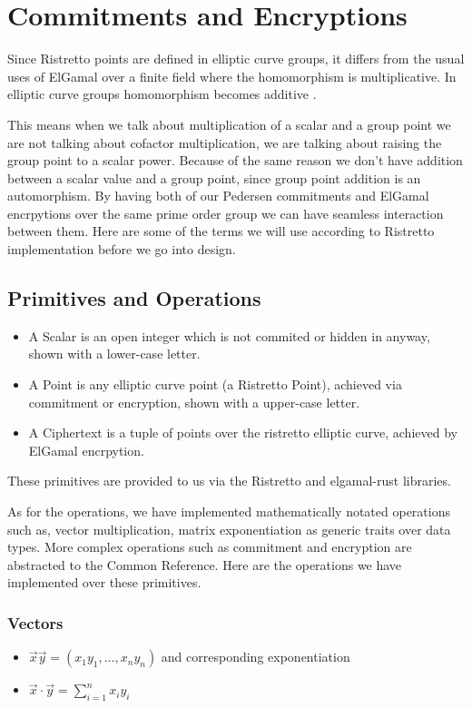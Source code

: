 \documentclass[12pt,a4paper]{report}
\begin{document}
\section{Commitments and Encryptions}
Since Ristretto points are defined in elliptic curve groups, it differs from the usual uses of ElGamal over a finite field where the homomorphism is multiplicative. 
In elliptic curve groups homomorphism becomes additive \cite{decaf}.\par
This means when we talk about multiplication of a scalar and a group point we are not talking about cofactor multiplication, 
we are talking about raising the group point to a scalar power. Because of the same reason we don't have addition between 
a scalar value and a group point, since group point addition is an automorphism.
By having both of our Pedersen commitments and ElGamal encrpytions over the same prime order group we can have seamless interaction between them. 
Here are some of the terms we will use according to Ristretto implementation before we go into design.
\subsection*{Primitives and Operations}
\begin{itemize}
	\item A Scalar is an open integer which is not commited or hidden in anyway, shown with a lower-case letter.
	\item A Point is any elliptic curve point (a Ristretto Point), achieved via commitment or encryption, shown with a upper-case letter. 
	\item A Ciphertext is a tuple of points over the ristretto elliptic curve, achieved by ElGamal encrpytion.
\end{itemize}
These primitives are provided to us via the Ristretto and elgamal-rust \cite{egrust} libraries.\par
As for the operations, we have implemented mathematically notated operations such as, 
vector multiplication, matrix exponentiation as generic traits over data types.
More complex operations such as commitment and encryption are abstracted to the Common Reference.
Here are the operations we have implemented over these primitives.
\subsubsection{Vectors}
\begin{itemize}
	\item $\vec{x}\vec{y} = (x_1y_1,\ldots,x_ny_n)$ and corresponding exponentiation
	\item $\vec{x}\cdot\vec{y} = \sum_{i=1}^n x_iy_i$
\end{itemize}
\end{document}
